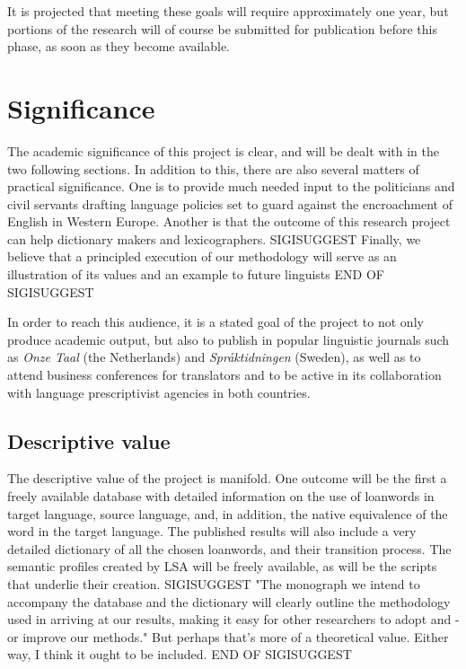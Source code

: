 \documentclass[a4paper]{article}
\begin{document}
It is projected that meeting these goals will require approximately one year, but portions of the research will of course be submitted for publication before this phase, as soon as they become available.



\section{Significance}
The academic significance of this project is clear, and will be dealt with in the two following sections. In addition to this, there are also several matters of  practical significance. One is to provide much needed input to the politicians and civil servants drafting language policies set to guard against the encroachment of English in Western Europe. Another is that the outcome of this research project can help dictionary makers and lexicographers. SIGISUGGEST Finally, we believe that a principled execution of our methodology will serve as an illustration of its values and an example to future linguists END OF SIGISUGGEST

In order to reach this audience, it is a stated goal of the project to not only produce academic output, but also to publish in popular linguistic journals such as \emph{Onze Taal} (the Netherlands) and \emph{Spr\aa ktidningen} (Sweden), as well as to attend business conferences for translators and to be active in its collaboration with language prescriptivist agencies in both countries. 


\subsection{Descriptive value}
The descriptive value of the project is manifold. One outcome will be the first a freely available database with detailed information on the use of loanwords in target language, source language, and, in addition, the native equivalence of the word in the target language. The published results will also include a very detailed dictionary of all the chosen loanwords, and their transition process. The semantic profiles created by LSA will be freely available, as will be the scripts that underlie their creation. 
SIGISUGGEST "The monograph we intend to accompany the database and the dictionary will clearly outline the methodology used in arriving at our results, making it easy for other researchers to adopt and - or improve our methods." But perhaps that's more of a theoretical value. Either way, I think it ought to be included. END OF SIGISUGGEST
\end{document}
